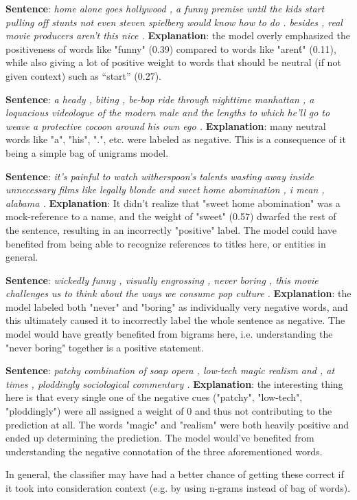 \documentclass[11pt]{article}
\begin{document}
\begin{compactenum}
\item \textbf{Sentence}: \textit{home alone goes hollywood , a funny premise until the kids start pulling off stunts not even steven spielberg would know how to         do . besides , real movie producers aren't this nice .} \textbf{Explanation}: the model overly emphasized the positiveness of words like "funny" (0.39) compared to words like "aren\'t" (0.11), while also giving a lot of positive weight to words that should be neutral (if not given context) such as ``start'' (0.27). 

\item \textbf{Sentence}: \textit{a heady , biting , be-bop ride through nighttime manhattan , a loquacious videologue of the modern male and the lengths to which        he'll go to weave a protective cocoon around his own ego .} \textbf{Explanation}: many neutral words like "a", "his", ".", etc. were labeled as negative. This is a consequence of it being a simple bag of unigrams model. 

\item \textbf{Sentence}: \textit{it's painful to watch witherspoon's talents wasting away inside unnecessary films like legally blonde and sweet home                   abomination , i mean , alabama .} \textbf{Explanation}: It didn't realize that "sweet home abomination" was a mock-reference to a name, and the weight of "sweet" (0.57) dwarfed the rest of the sentence, resulting in an incorrectly "positive" label. The model could have benefited from being able to recognize references to titles here, or entities in general. 

\item \textbf{Sentence}: \textit{ wickedly funny , visually engrossing , never boring , this movie challenges us to think about the ways we consume pop culture .} \textbf{Explanation}: the model labeled both "never" and "boring" as individually very negative words, and this ultimately caused it to incorrectly label the whole sentence as negative. The model would have greatly benefited from bigrams here, i.e. understanding the "never boring" together is a positive statement.

\item \textbf{Sentence}: \textit{ patchy combination of soap opera , low-tech magic realism and , at times , ploddingly sociological commentary .} \textbf{Explanation}: the interesting thing here is that every single one of the negative cues ("patchy", "low-tech", "ploddingly") were all assigned a weight of 0 and thus not contributing to the prediction at all. The words "magic" and "realism" were both heavily positive and ended up determining the prediction. The model would've benefited from understanding the negative connotation of the three aforementioned words.
\end{compactenum}
In general, the classifier may have had a better chance of getting these correct if it took into consideration context (e.g. by using n-grams instead of bag of words). 
\end{document}

